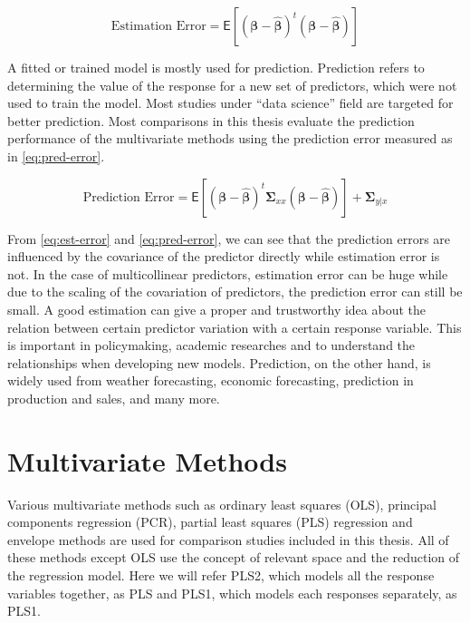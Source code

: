 \documentclass[11pt,twoside,openright,titlepage,
  headinclude,footinclude,BCOR=5mm,
  numbers=noenddot,cleardoublepage=empty,
  tablecaptionabove, dottedtoc,
  bibliography=totoc,paper=a4]{scrreprt}
\begin{document}
\begin{equation}
\text{Estimation Error} = \mathsf{E}\left[
  \left(\boldsymbol{\beta} - \hat{\boldsymbol{\beta}}\right)^t 
  \left(\boldsymbol{\beta} - \hat{\boldsymbol{\beta}}\right)
\right]
\label{eq:est-error}
\end{equation}

A fitted or trained model is mostly used for prediction. Prediction refers to determining the value of the response for a new set of predictors, which were not used to train the model. Most studies under ``data science'' field are targeted for better prediction. Most comparisons in this thesis evaluate the prediction performance of the multivariate methods using the prediction error measured as in \eqref{eq:pred-error}.

\begin{equation}
\text{Prediction Error} = \mathsf{E}\left[
  \left(\boldsymbol{\beta} - \hat{\boldsymbol{\beta}}\right)^t
  \boldsymbol{\Sigma}_{xx}
  \left(\boldsymbol{\beta} - \hat{\boldsymbol{\beta}}\right)
\right] + \boldsymbol{\Sigma}_{y|x}
\label{eq:pred-error}
\end{equation}

From \eqref{eq:est-error} and \eqref{eq:pred-error}, we can see that the prediction errors are influenced by the covariance of the predictor directly while estimation error is not. In the case of multicollinear predictors, estimation error can be huge while due to the scaling of the covariation of predictors, the prediction error can still be small. A good estimation can give a proper and trustworthy idea about the relation between certain predictor variation with a certain response variable. This is important in policymaking, academic researches and to understand the relationships when developing new models. Prediction, on the other hand, is widely used from weather forecasting, economic forecasting, prediction in production and sales, and many more.

\hypertarget{multivariate-methods}{%
\section{Multivariate Methods}\label{multivariate-methods}}

Various multivariate methods such as ordinary least squares (OLS), principal components regression (PCR), partial least squares (PLS) regression and envelope methods are used for comparison studies included in this thesis. All of these methods except OLS use the concept of relevant space and the reduction of the regression model. Here we will refer PLS2, which models all the response variables together, as PLS and PLS1, which models each responses separately, as PLS1.
\end{document}
